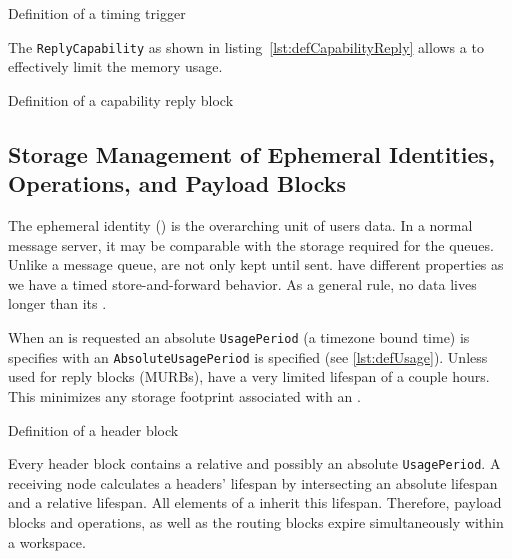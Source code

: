 \begin{lstfloat}[ht]
	
	\caption{Definition of a timing trigger}
	\label{lst:defUsage}
\end{lstfloat}

The \texttt{ReplyCapability} as shown in listing~\ref{lst:defCapabilityReply} allows a \VortexNode{} to effectively limit the memory usage. 
\begin{lstfloat}[ht]
	
	\caption{Definition of a capability reply block}
	\label{lst:defCapabilityReply}
\end{lstfloat}


\subsection{Storage Management of Ephemeral Identities,  Operations, and Payload Blocks}
The ephemeral identity () is the overarching unit of users data. In a normal message server, it may be comparable with the storage required for the queues. Unlike a message queue, \VortexMessages{} are not only kept until sent. \VortexMessages{} have different properties as we have a timed store-and-forward behavior. As a general rule, no data lives longer than its .

When an  is requested an absolute \texttt{UsagePeriod} (a timezone bound time) is specifies with an \texttt{AbsoluteUsagePeriod} is specified (see \cref{lst:defUsage}). Unless used for reply blocks (MURBs),  have a very limited lifespan of a couple hours. This minimizes any storage footprint associated with an . 

\begin{lstfloat}[ht]
	
	\caption{Definition of a header block}
	\label{lst:defHeaderBlock}
\end{lstfloat}

Every header block contains a relative and possibly an absolute \texttt{UsagePeriod}. A receiving node calculates a headers' lifespan by intersecting an absolute lifespan and a relative lifespan. All elements of a \VortexMessage{} inherit this lifespan. Therefore, payload blocks and operations, as well as the routing blocks expire simultaneously within a workspace.


